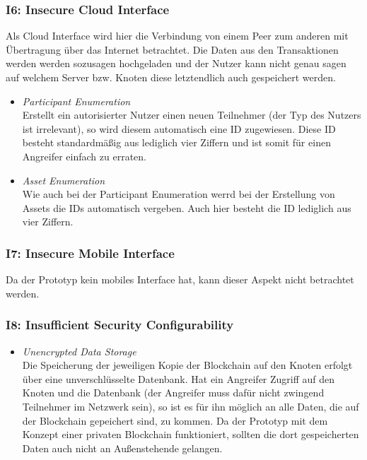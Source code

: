         \subsubsection*{I6: Insecure Cloud Interface}
            Als Cloud Interface wird hier die Verbindung von einem Peer zum anderen mit Übertragung über das Internet betrachtet.
            Die Daten aus den Transaktionen werden werden sozusagen hochgeladen und der Nutzer kann nicht genau sagen auf welchem Server bzw. Knoten diese letztendlich auch gespeichert werden.
            \begin{itemize}[leftmargin=0cm,label={}]
                \item \emph{Participant Enumeration}\label{vuln:prototype_enum_part}\\
                    Erstellt ein autorisierter Nutzer einen neuen Teilnehmer (der Typ des Nutzers ist irrelevant), so wird diesem automatisch eine ID zugewiesen. 
                    Diese ID besteht standardmäßig aus lediglich vier Ziffern und ist somit für einen Angreifer einfach zu erraten.
                \item \emph{Asset Enumeration}\label{vuln:prototype_enum_asset}\\
                    Wie auch bei der Participant Enumeration werrd bei der Erstellung von Assets die IDs automatisch vergeben. 
                    Auch hier besteht die ID lediglich aus vier Ziffern.
            \end{itemize}
            
        \subsubsection*{I7: Insecure Mobile Interface}
            Da der Prototyp kein mobiles Interface hat, kann dieser Aspekt nicht betrachtet werden.
            
        \subsubsection*{I8: Insufficient Security Configurability}
            \begin{itemize}[leftmargin=0cm,label={}]
    	        \item \emph{Unencrypted Data Storage}\label{vuln:prototype_db}\\
                    Die Speicherung der jeweiligen Kopie der Blockchain auf den Knoten erfolgt über eine unverschlüsselte Datenbank. 
                    Hat ein Angreifer Zugriff auf den Knoten und die Datenbank (der Angreifer muss dafür nicht zwingend Teilnehmer im Netzwerk sein), so ist es für ihn möglich an alle Daten, die auf der Blockchain gepeichert sind, zu kommen. 
                    Da der Prototyp mit dem Konzept einer privaten Blockchain funktioniert, sollten die dort gespeicherten Daten auch nicht an Außenstehende gelangen.
            \end{itemize}
            
